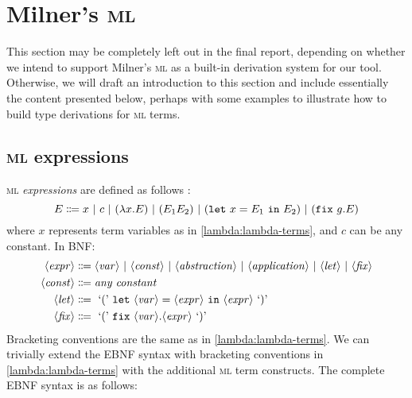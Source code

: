 \section{Milner's \textsc{ml}}
This section may be completely left out in the final report, depending on whether we intend to support Milner's \textsc{ml} as a built-in derivation system for our tool. Otherwise, we will draft an introduction to this section and include essentially the content presented below, perhaps with some examples to illustrate how to build type derivations for \textsc{ml} terms.

\subsection{\textsc{ml} expressions}
\textsc{ml} \textit{expressions} are defined as follows \cite{van-bakel:2022}:
\[
    E \Coloneqq x \ |\  c \ |\  (\lambda x. E) \ |\  (E_1 E_2) \ |\  (\texttt{let}\ x = E_1 \ \texttt{in}\  E_2) \ |\  (\texttt{fix}\ g. E)
\]
where $x$ represents term variables as in \ref{lambda:lambda-terms}, and $c$ can be any constant. In BNF:
\begin{align*}
    \langle\mathit{expr}\rangle &\Coloneqq \langle\mathit{var}\rangle \ |\  \langle\mathit{const}\rangle \ |\  \langle\mathit{abstraction}\rangle \ |\  \langle\mathit{application}\rangle \ |\  \langle\mathit{let}\rangle \ |\  \langle\mathit{fix}\rangle \\
    \langle\mathit{const}\rangle &\Coloneqq \textit{any constant} \\
    \langle\mathit{let}\rangle &\Coloneqq \text{ `(' } \texttt{let}\ \langle\mathit{var}\rangle = \langle\mathit{expr}\rangle\ \texttt{in}\ \langle\mathit{expr}\rangle \text{ `)' } \\
    \langle\mathit{fix}\rangle &\Coloneqq \text{ `(' } \texttt{fix}\ \langle\mathit{var}\rangle. \langle\mathit{expr}\rangle \text{ `)' }
\end{align*}
Bracketing conventions are the same as in \ref{lambda:lambda-terms}. We can trivially extend the EBNF syntax with bracketing conventions in \ref{lambda:lambda-terms} with the additional \textsc{ml} term constructs. The complete EBNF syntax is as follows:
